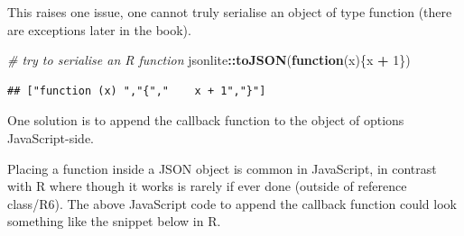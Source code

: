 \documentclass[
]{krantz}
\makeatletter
\newenvironment{Shaded}{\begin{snugshade}}{\end{snugshade}}
\newcommand{\CommentTok}[1]{\textcolor[rgb]{0.37,0.37,0.37}{\textit{#1}}}
\newcommand{\ControlFlowTok}[1]{\textcolor[rgb]{0.27,0.27,0.27}{\textbf{#1}}}
\newcommand{\DataTypeTok}[1]{\textcolor[rgb]{0.27,0.27,0.27}{#1}}
\newcommand{\DecValTok}[1]{\textcolor[rgb]{0.06,0.06,0.06}{#1}}
\newcommand{\KeywordTok}[1]{\textcolor[rgb]{0.27,0.27,0.27}{\textbf{#1}}}
\newcommand{\NormalTok}[1]{#1}
\newcommand{\OperatorTok}[1]{\textcolor[rgb]{0.43,0.43,0.43}{\textbf{#1}}}
\newcommand{\StringTok}[1]{\textcolor[rgb]{0.5,0.5,0.5}{#1}}
\newenvironment{kframe}{%
\medskip{}
\setlength{\fboxsep}{.8em}
 \def\at@end@of@kframe{}%
 \ifinner\ifhmode%
  \def\at@end@of@kframe{\end{minipage}}%
  \begin{minipage}{\columnwidth}%
 \fi\fi%
 \def\FrameCommand##1{\hskip\@totalleftmargin \hskip-\fboxsep
 \colorbox{shadecolor}{##1}\hskip-\fboxsep
     \hskip-\linewidth \hskip-\@totalleftmargin \hskip\columnwidth}%
 \MakeFramed {\advance\hsize-\width
   \@totalleftmargin\z@ \linewidth\hsize
   \@setminipage}}%
 {\par\unskip\endMakeFramed%
 \at@end@of@kframe}
\renewenvironment{Shaded}{\begin{kframe}}{\end{kframe}}
\makeatother
\begin{document}
This raises one issue, one cannot truly serialise an object of type function (there are exceptions later in the book).

\begin{Shaded}
\begin{Highlighting}[]
\CommentTok{\# try to serialise an R function}
\NormalTok{jsonlite}\OperatorTok{::}\KeywordTok{toJSON}\NormalTok{(}\ControlFlowTok{function}\NormalTok{(x)\{x }\OperatorTok{+}\StringTok{ }\DecValTok{1}\NormalTok{\})}
\end{Highlighting}
\end{Shaded}

\begin{verbatim}
## ["function (x) ","{","    x + 1","}"]
\end{verbatim}

One solution is to append the callback function to the object of options JavaScript-side.

\begin{Shaded}
\end{Shaded}

Placing a function inside a JSON object is common in JavaScript, in contrast with R where though it works is rarely if ever done (outside of reference class/R6). The above JavaScript code to append the callback function could look something like the snippet below in R.

\begin{Shaded}
\end{Shaded}
\end{document}
